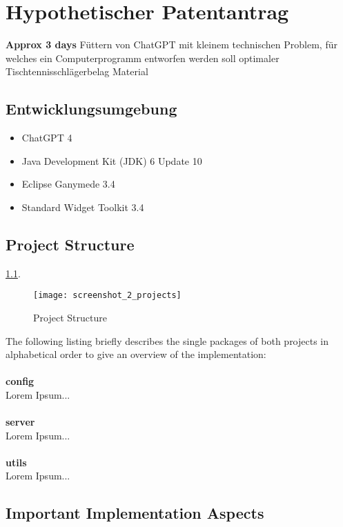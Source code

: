 \chapter{Hypothetischer Patentantrag\label{cha:chapter5}}
\textbf{Approx 3 days}
Füttern von ChatGPT mit kleinem technischen Problem, für welches ein Computerprogramm entworfen werden soll 
optimaler Tischtennisschlägerbelag Material

\section{Entwicklungsumgebung\label{sec:env}}


\begin{itemize}
		\item ChatGPT 4
		\vspace{-0.1in} 
		\item Java Development Kit (JDK) 6 Update 10 
		\vspace{-0.1in} 
		\item Eclipse Ganymede 3.4
		\vspace{-0.1in} 
		\item Standard Widget Toolkit 3.4
\end{itemize}

\section{Project Structure\label{sec:projectstructure}}


\ref{fig:projects}.

\begin{figure}[htb]
  \centering
  \texttt{[image: screenshot\_2\_projects]}
  \caption{Project Structure}
  \label{fig:projects}
\end{figure}

\noindent
The following listing briefly describes the single packages of both projects in alphabetical order to give an overview of the implementation:
\\
\\
\textbf{config} 
\\
Lorem Ipsum...
\\
\\
\textbf{server} 
\\
Lorem Ipsum...
\\
\\
\textbf{utils} 
\\
Lorem Ipsum...

\section{Important Implementation Aspects\label{sec:implaspects}}

